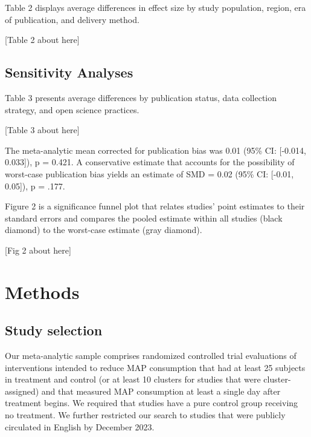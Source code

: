 \documentclass[sn-nature,referee,pdflatex]{sn-jnl}
\begin{document}
Table 2 displays average differences in effect size by study population,
region, era of publication, and delivery method.

\begin{center}
[Table 2 about here]
\end{center}

\subsection{Sensitivity Analyses}\label{sec2.5}

Table 3 presents average differences by publication status, data
collection strategy, and open science practices.

\begin{center}
[Table 3 about here]
\end{center}

The meta-analytic mean corrected for publication bias \citep{hedges1992}
was 0.01 (95\% CI: {[}-0.014, 0.033{]}), p = 0.421. A conservative
estimate that accounts for the possibility of worst-case publication
bias \citep{mathur2024} yields an estimate of SMD = 0.02 (95\% CI:
{[}-0.01, 0.05{]}), p = .177.

Figure 2 is a significance funnel plot \citep{mathur2020} that relates
studies' point estimates to their standard errors and compares the
pooled estimate within all studies (black diamond) to the worst-case
estimate (gray diamond).

\begin{center}
[Fig 2 about here]
\end{center}

\section{Methods}\label{sec3}

\subsection{Study selection}\label{sec3.1}

Our meta-analytic sample comprises randomized controlled trial
evaluations of interventions intended to reduce MAP consumption that had
at least 25 subjects in treatment and control (or at least 10 clusters
for studies that were cluster-assigned) and that measured MAP
consumption at least a single day after treatment begins. We required
that studies have a pure control group receiving no treatment. We
further restricted our search to studies that were publicly circulated
in English by December 2023.
\end{document}

